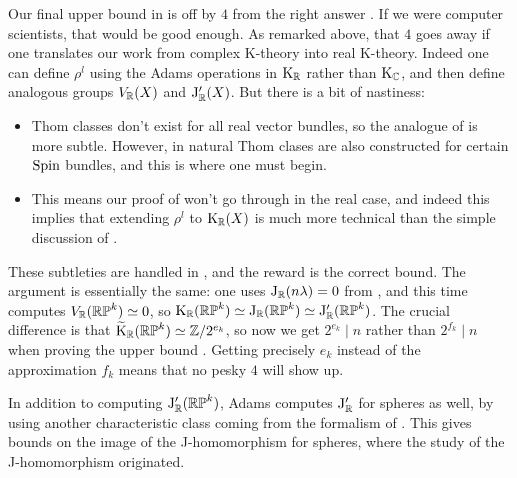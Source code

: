 \begin{remark}
  Our final upper bound in  is off by $4$ from the
  right answer . If we were computer
  scientists, that would be good enough. As remarked above, that $4$
  goes away if one translates our work from complex K-theory into real
  K-theory. Indeed one can define $\rho^l$ using the Adams operations
  in $\mathrm{K}_{\mathbb{R}}$ rather than $\mathrm{K}_{\mathbb{C}}$, and then define analogous groups
  $V_{\mathbb{R}}(X)$ and $\mathrm{J}'_{\mathbb{R}}(X)$. But there is a bit of nastiness:
  \begin{itemize}
  \item Thom classes don't exist for all real vector bundles, so the
    analogue of  is more subtle. However, in
    \cite{abs-clifford} natural Thom clases are also constructed for
    certain $\operatorname{Spin}$ bundles, and this is where one must begin.
  \item This means our proof of  won't go through
    in the real case, and indeed this implies that extending $\rho^l$
    to $\mathrm{K}_{\mathbb{R}}(X)$ is much more technical than the simple discussion of
    .
  \end{itemize}
  These subtleties are handled in \cite{adams-J-II}, and the reward is
  the correct bound. The argument is essentially the same: one uses
  $\mathrm{J}_{\mathbb{R}}(n\lambda) = 0$ from , and this time
  computes $V_{\mathbb{R}}(\mathbb{RP}^k) \simeq 0$, so $\mathrm{K}_{\mathbb{R}}(\mathbb{RP}^k) \simeq
  \mathrm{J}_{\mathbb{R}}(\mathbb{RP}^k) \simeq \mathrm{J}_{\mathbb{R}}'(\mathbb{RP}^k)$. The crucial difference is that
  $\widetilde{\mathrm{K}}_{\mathbb{R}}(\mathbb{RP}^k) \simeq \mathbb{Z}/2^{e_k}$, so now we get $2^{e_k} \mid n$
  rather than $2^{f_k} \mid n$ when proving the upper bound
  . Getting precisely $e_k$ instead of the
  approximation $f_k$ means that no pesky $4$ will show up.
\end{remark}

\begin{remark}
  In addition to computing $\mathrm{J}_{\mathbb{R}}'(\mathbb{RP}^k)$, Adams computes $\mathrm{J}_{\mathbb{R}}'$
  for spheres as well, by using another characteristic class coming
  from the formalism of . This gives bounds on
  the image of the J-homomorphism for spheres, where the study of the
  J-homomorphism originated.
\end{remark}


\nocite{mathew-J, shah-vfields}




